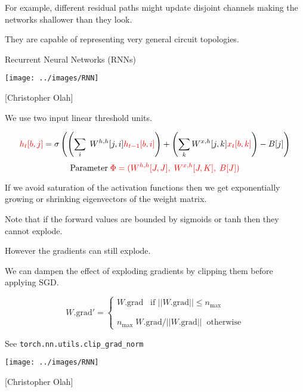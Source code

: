 {\begin{minipage}[b]{4in}
  \bigskip
  \bigskip
  For example, different residual paths might update disjoint channels making the networks shallower than they look.

  \bigskip
  \bigskip
  They are capable of representing very general circuit topologies.
\end{minipage}

\slideplain{}
\vfill
\centerline{Recurrent Neural Networks (RNNs)}
\vfill
\vfill




\centerline{\texttt{[image: ../images/RNN]}}
\centerline{{\large [Christopher Olah]}}

We use two input linear threshold units.

{\huge
$${\color{red} h_t[b,j]} = \sigma\left(\left(\sum_i\;W^{h,h}[j,i]{\color{red} h_{t-1}[b,i]}\right) + \left(\sum_k W^{x,h}[j,k]{\color{red} x_t[b,k]}\right) - B[j]\right)$$
}
\vfill
$$\mathrm{Parameter}\;{\color{red} \Phi = (W^{h,h}[J,J],\;W^{x,h}[J,K],\;B[J])}$$



\vfill
If we avoid saturation of the activation functions then we get exponentially growing or shrinking eigenvectors of the weight matrix.

\vfill
Note that if the forward values are bounded by sigmoids or tanh then they cannot explode.

\vfill
However the gradients can still explode.


\vfill
We can dampen the effect of exploding gradients by clipping them before applying SGD.

\vfill
$$W.\mathrm{grad'} = \left\{\begin{array}{l} W.\mathrm{grad} \;\;\;\mbox{if $||W.\mathrm{grad}|| \leq n_{\mathrm{max}}$} \\
                                                      \\ \\
                                                      n_{\mathrm{max}} \; W.\mathrm{grad} / ||W.\mathrm{grad}|| \;\; \mbox{otherwise}
\end{array} \right.$$

\vfill
See {\tt torch.nn.utils.clip\_grad\_norm}


\centerline{\texttt{[image: ../images/RNN]}}
\centerline{{\large [Christopher Olah]}}

}
